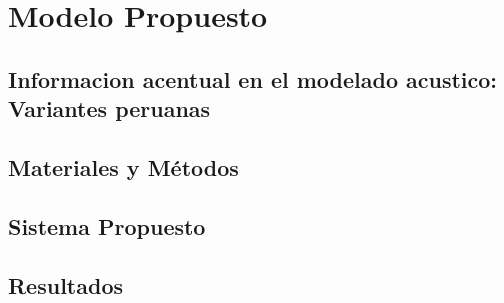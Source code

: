 \chapter{Modelo Propuesto}
\section{Informacion acentual en el modelado acustico: Variantes peruanas}
\section{Materiales y Métodos}
\section{Sistema Propuesto}
\section{Resultados}
